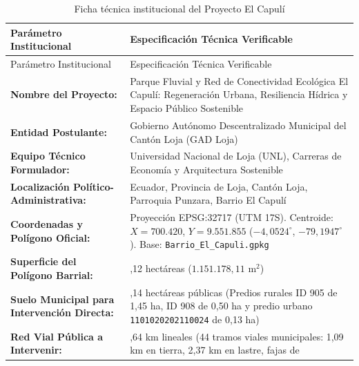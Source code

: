 \documentclass[
  spanish,
  letterpaper,
  DIV=11,
  numbers=noendperiod]{scrartcl}
\begin{document}
\begin{longtable}[]{@{}
  >{\raggedright\arraybackslash}p{}
  >{\raggedright\arraybackslash}p{}@{}}
\caption{Ficha técnica institucional del Proyecto El
Capulí}\label{tbl-factsheet}\tabularnewline
\toprule\noalign{}
\begin{minipage}[b]{\linewidth}\raggedright
Parámetro Institucional
\end{minipage} & \begin{minipage}[b]{\linewidth}\raggedright
Especificación Técnica Verificable
\end{minipage} \\
\midrule\noalign{}
\endfirsthead
\toprule\noalign{}
\begin{minipage}[b]{\linewidth}\raggedright
Parámetro Institucional
\end{minipage} & \begin{minipage}[b]{\linewidth}\raggedright
Especificación Técnica Verificable
\end{minipage} \\
\midrule\noalign{}
\endhead
\bottomrule\noalign{}
\endlastfoot
\textbf{Nombre del Proyecto:} & Parque Fluvial y Red de Conectividad
Ecológica El Capulí: Regeneración Urbana, Resiliencia Hídrica y Espacio
Público Sostenible \\
\textbf{Entidad Postulante:} & Gobierno Autónomo Descentralizado
Municipal del Cantón Loja (GAD Loja) \\
\textbf{Equipo Técnico Formulador:} & Universidad Nacional de Loja
(UNL), Carreras de Economía y Arquitectura Sostenible \\
\textbf{Localización Político-Administrativa:} & Ecuador, Provincia de
Loja, Cantón Loja, Parroquia Punzara, Barrio El Capulí \\
\textbf{Coordenadas y Polígono Oficial:} & Proyección EPSG:32717 (UTM
17S). Centroide: \(X=700.420\), \(Y=9.551.855\) (\(-4,0524^\circ\),
\(-79,1947^\circ\)). Base: \texttt{Barrio\_El\_Capuli.gpkg} \\
\textbf{Superficie del Polígono Barrial:} & 115,12 hectáreas
(\(1.151.178,11 \text{ m}^2\)) \\
\textbf{Suelo Municipal para Intervención Directa:} & 2,14 hectáreas
públicas (Predios rurales ID 905 de 1,45 ha, ID 908 de 0,50 ha y predio
urbano \texttt{1101020202110024} de 0,13 ha) \\
\textbf{Red Vial Pública a Intervenir:} & 9,64 km lineales (44 tramos
viales municipales: 1,09 km en tierra, 2,37 km en lastre, fajas de

\end{longtable}
\end{document}
